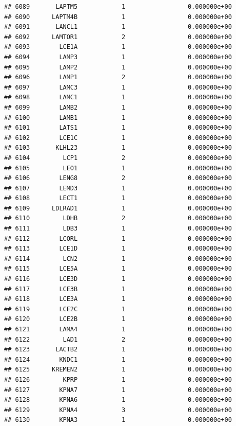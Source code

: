 \documentclass[
]{article}
\begin{document}
\begin{verbatim}
## 6089       LAPTM5            1                 0.000000e+00
## 6090      LAPTM4B            1                 0.000000e+00
## 6091       LANCL1            1                 0.000000e+00
## 6092      LAMTOR1            2                 0.000000e+00
## 6093        LCE1A            1                 0.000000e+00
## 6094        LAMP3            1                 0.000000e+00
## 6095        LAMP2            1                 0.000000e+00
## 6096        LAMP1            2                 0.000000e+00
## 6097        LAMC3            1                 0.000000e+00
## 6098        LAMC1            1                 0.000000e+00
## 6099        LAMB2            1                 0.000000e+00
## 6100        LAMB1            1                 0.000000e+00
## 6101        LATS1            1                 0.000000e+00
## 6102        LCE1C            1                 0.000000e+00
## 6103       KLHL23            1                 0.000000e+00
## 6104         LCP1            2                 0.000000e+00
## 6105         LEO1            1                 0.000000e+00
## 6106        LENG8            2                 0.000000e+00
## 6107        LEMD3            1                 0.000000e+00
## 6108        LECT1            1                 0.000000e+00
## 6109      LDLRAD1            1                 0.000000e+00
## 6110         LDHB            2                 0.000000e+00
## 6111         LDB3            1                 0.000000e+00
## 6112        LCORL            1                 0.000000e+00
## 6113        LCE1D            1                 0.000000e+00
## 6114         LCN2            1                 0.000000e+00
## 6115        LCE5A            1                 0.000000e+00
## 6116        LCE3D            1                 0.000000e+00
## 6117        LCE3B            1                 0.000000e+00
## 6118        LCE3A            1                 0.000000e+00
## 6119        LCE2C            1                 0.000000e+00
## 6120        LCE2B            1                 0.000000e+00
## 6121        LAMA4            1                 0.000000e+00
## 6122         LAD1            2                 0.000000e+00
## 6123       LACTB2            1                 0.000000e+00
## 6124        KNDC1            1                 0.000000e+00
## 6125      KREMEN2            1                 0.000000e+00
## 6126         KPRP            1                 0.000000e+00
## 6127        KPNA7            1                 0.000000e+00
## 6128        KPNA6            1                 0.000000e+00
## 6129        KPNA4            3                 0.000000e+00
## 6130        KPNA3            1                 0.000000e+00

\end{verbatim}
\end{document}
